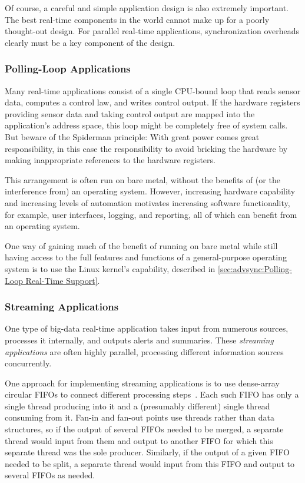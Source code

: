Of course, a careful and simple application design is also extremely
important.
The best real-time components in the world cannot make up for a
poorly thought-out design.
For parallel real-time applications, synchronization overheads clearly
must be a key component of the design.

\subsubsection{Polling-Loop Applications}
\label{sec:advsync:Polling-Loop Applications}

Many real-time applications consist of a single CPU-bound loop that
reads sensor data, computes a control law, and writes control output.
If the hardware registers providing sensor data and taking control
output are mapped into the application's address space, this loop
might be completely free of system calls.
But beware of the Spiderman principle:
With great power comes great responsibility, in this case the
responsibility to avoid bricking the hardware by making inappropriate
references to the hardware registers.

This arrangement is often run on bare metal, without the benefits of
(or the interference from) an operating system.
However, increasing hardware capability and increasing levels of
automation motivates increasing software functionality, for example,
user interfaces, logging, and reporting, all of which can benefit from
an operating system.

One way of gaining much of the benefit of running on bare metal while
still having access to the full features and functions of a
general-purpose operating system is to use the Linux kernel's
 capability, described in
\cref{sec:advsync:Polling-Loop Real-Time Support}.

\subsubsection{Streaming Applications}
\label{sec:advsync:Streaming Applications}

One type of big-data real-time application takes input from numerous
sources, processes it internally, and outputs alerts and summaries.
These \emph{streaming applications} are often highly parallel, processing
different information sources concurrently.

One approach for implementing streaming applications is to use
dense-array circular FIFOs to connect different processing
steps~\cite{AdrianSutton2013LCA:Disruptor}.
Each such FIFO has only a single thread producing into it and a
(presumably different) single thread consuming from it.
Fan-in and fan-out points use threads rather than data structures,
so if the output of several FIFOs needed to be merged, a separate
thread would input from them and output to another FIFO for which
this separate thread was the sole producer.
Similarly, if the output of a given FIFO needed to be split, a separate
thread would input from this FIFO and output to several FIFOs as needed.

